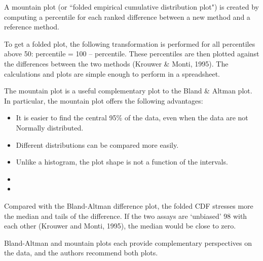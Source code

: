 \documentclass[Chap2bmain.tex]{subfiles}
\begin{document}


A mountain plot (or ``folded empirical cumulative distribution plot") is created by computing a percentile for each ranked difference between a new method and a reference method. 

To get a folded plot, the following transformation is performed for all percentiles above 50: 
percentile = 100 – percentile. These percentiles are then plotted against the differences between 
the two methods (Krouwer \& Monti, 1995). The calculations and plots are simple enough to perform in a spreadsheet. 

The mountain plot is a useful complementary plot to the Bland \& Altman plot. 
In particular, the mountain plot offers the following advantages:
\begin{itemize}
\item It is easier to find the central 95\% of the data, even when the data are not Normally distributed.
\item Different distributions can be compared more easily.
\item Unlike a histogram, the plot shape is not a function of the intervals. 
\item
\item
\end{itemize}


Compared with the Bland-Altman difference plot, the folded CDF stresses more the median and tails of the difference. 
If the two assays are ‘unbiased’ 98 with each other (Krouwer and Monti, 1995), the median would be close to zero. 



Bland-Altman and mountain plots each provide complementary perspectives on the data, and the authors recommend both plots.
\end{document}
